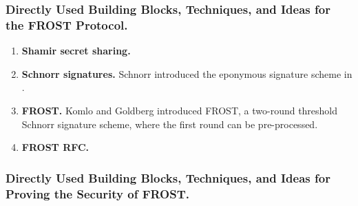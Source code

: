 
\subsubsection{Directly Used Building Blocks, Techniques, and Ideas for the FROST Protocol.}

\begin{enumerate}
\item \textbf{Shamir secret sharing.}
\item \textbf{Schnorr signatures.} Schnorr introduced the eponymous signature scheme in \cite{Schnorr91}. 
\item \textbf{FROST.} Komlo and Goldberg introduced FROST, a two-round threshold Schnorr signature scheme, where the first round can be pre-processed. 
\item \textbf{FROST RFC.}
\end{enumerate}

\subsubsection{Directly Used Building Blocks, Techniques, and Ideas for Proving the Security of FROST.}

